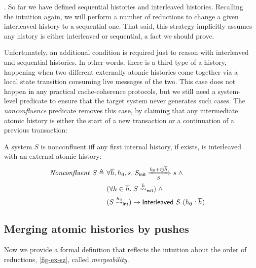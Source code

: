 \documentclass[sigplan,10pt,review,anonymous,screen]{acmart}\settopmatter{printfolios=true,printccs=false,printacmref=false}
\begin{document}
.
So far we have defined sequential histories and interleaved histories.
Recalling the intuition again, we will perform a number of reductions to change a given interleaved history to a sequential one.
That said, this strategy implicitly assumes any history is either interleaved or sequential, a fact we should prove.

Unfortunately, an additional condition is required just to reason with interleaved and sequential histories.
In other words, there is a third type of a history, happening when two different externally atomic histories come together via a local state transition consuming live messages of the two.
This case does not happen in any practical cache-coherence protocols, but we still need a system-level predicate to ensure that the target system never generates such cases.
The \emph{nonconfluence} predicate removes this case, by claiming that any intermediate atomic history is either the start of a new transaction or a continuation of a previous transaction:
\newcommand{\sncf}[1]{\ensuremath{\mathit{Nonconfluent}\ #1}}
\begin{definition}[Nonconfluence]
  A system $S$ is nonconfluent iff any first internal history, if exists, is
  interleaved with an external atomic history:
  \begin{align*}
    \sncf{S} \triangleq\ & \forall \listof{h}, h_0, s.\; \semsteps{S}{\sysInit{S}}{\listapp{h_0}{\listconcat{\listof{h}}}}{s} \; \land \\
    & (\forall h \in \listof{h}.\; \extatomicshort{S}{h}) \; \land \\
    & (\intatomicshort{S}{h_0}) \to \hitlv{S}{(\listcons{h_0}{\listof{h}})}.
  \end{align*}
\end{definition}

\subsection{Merging atomic histories by pushes}

\newcommand{\hmgb}[3]{\ensuremath{#1 \vdash #2 \hookrightarrow #3}}
\newcommand{\smgb}[1]{\ensuremath{\mathit{Mergeable}\ #1}}

Now we provide a formal definition that reflects the intuition about the order of reductions, \autoref{fig-ex-sz}, called \emph{mergeability}.
\end{document}
